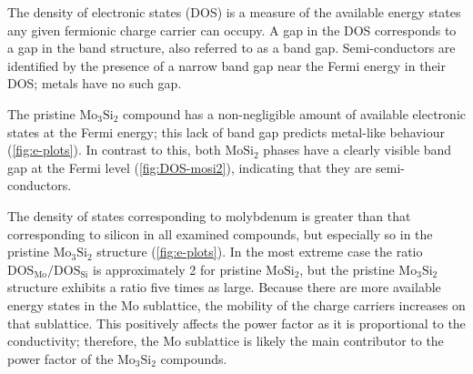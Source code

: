 \documentclass[7.5pt]{article}
\theoremstyle{plain}
\theoremstyle{definition}
\newcommand{\<}{\langle}
\renewcommand{\>}{\rangle}
\begin{document}
\begin{multicols}{2}

\noindent The density of electronic states (DOS) is a measure of the available energy states any given fermionic charge carrier can occupy.
A gap in the DOS corresponds to a gap in the band structure, also referred to as a band gap.
Semi-conductors are identified by the presence of a narrow band gap near the Fermi energy in their DOS; metals have no such gap.

The pristine $\text{Mo}_3\text{Si}_2$ compound has a non-negligible amount of available electronic states at the Fermi energy; this lack of band gap predicts metal-like behaviour (\autoref{fig:e-plots}).
In contrast to this, both $\text{MoSi}_2$ phases have a clearly visible band gap at the Fermi level (\autoref{fig:DOS-mosi2}), indicating that they are semi-conductors.

The density of states corresponding to molybdenum is greater than that corresponding to silicon in all examined compounds, but especially so in the pristine $\text{Mo}_3\text{Si}_2$ structure (\autoref{fig:e-plots}).
In the most extreme case the ratio $\text{DOS}_\text{Mo}/\text{DOS}_\text{Si}$ is approximately 2 for pristine $\text{MoSi}_2$, but the pristine $\text{Mo}_3\text{Si}_2$ structure exhibits a ratio five times as large.
Because there are more available energy states in the Mo sublattice, the mobility of the charge carriers increases on that sublattice.
This positively affects the power factor as it is proportional to the conductivity; therefore, the Mo sublattice is likely the main contributor to the power factor of the $\text{Mo}_3\text{Si}_2$ compounds. 

\end{multicols}
\end{document}

